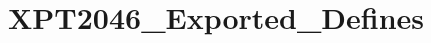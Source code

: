 \hypertarget{group___x_p_t2046___exported___defines}{}\section{X\+P\+T2046\+\_\+\+Exported\+\_\+\+Defines}
\label{group___x_p_t2046___exported___defines}
